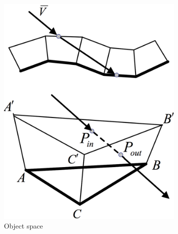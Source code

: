\begin{figure}\label{f:gdm-rendering-ray}
\begin{center}
	\begin{subfigure}[b]{0.3\textwidth}
		\includegraphics[width=1.0\textwidth]{graphics/df/GDM-object-space-ray}	
		\caption{Object space}
	\end{subfigure}
	\begin{subfigure}[b]{0.3\textwidth}

\end{subfigure}
\end{center}
\end{figure}

